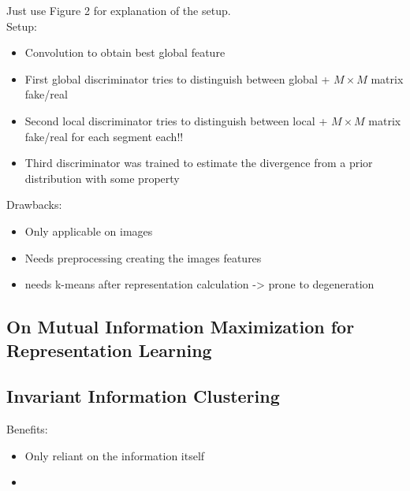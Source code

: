 \documentclass[]{article}
\begin{document}
Just use Figure 2 for explanation of the setup.\\
Setup:
\begin{itemize}
	\item Convolution to obtain best global feature
	\item First global discriminator tries to distinguish between global + $M \times M$ matrix fake/real
	\item Second local discriminator tries to distinguish between local + $M \times M$ matrix fake/real for each segment each!!
	\item Third discriminator was trained to estimate the divergence from a prior distribution with some property
\end{itemize}

Drawbacks:
\begin{itemize}
	\item Only applicable on images
	\item Needs preprocessing creating the images features
	\item needs k-means after representation calculation -> prone to degeneration
\end{itemize}


\subsection{On Mutual Information Maximization for Representation Learning}

\subsection{Invariant Information Clustering}
Benefits:
\begin{itemize}
	\item Only reliant on the information itself
	\item 
\end{itemize}
\end{document}
